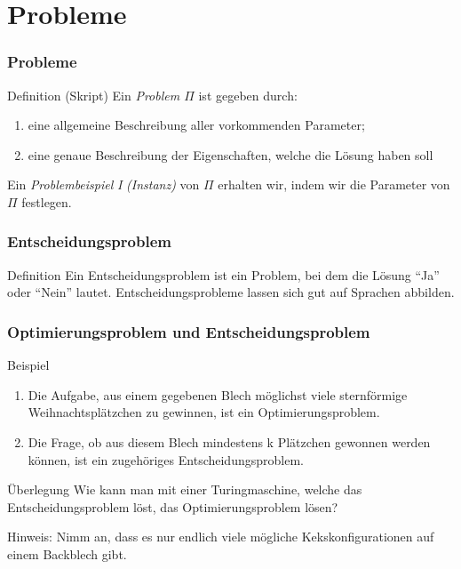 \documentclass{beamer}
\begin{document}
{\section{Probleme}
\begin{frame}
 \frametitle{Probleme}
 \begin{block}{Definition (Skript)}
 Ein \emph{Problem $\Pi$} ist gegeben durch:
 \begin{enumerate}
  \item eine allgemeine Beschreibung aller vorkommenden Parameter;
  \item eine genaue Beschreibung der Eigenschaften, welche die Lösung haben soll
 \end{enumerate}
 \end{block}
 Ein \emph{Problembeispiel} \textit{I} \emph{(Instanz)} von $\Pi$ erhalten wir, indem wir die Parameter von $\Pi$ festlegen.
\end{frame}

\begin{frame}
 \frametitle{Entscheidungsproblem}
 \begin{block}{Definition}
  Ein Entscheidungsproblem ist ein Problem, bei dem die Lösung ``Ja'' oder ``Nein'' lautet. 
  Entscheidungsprobleme lassen sich gut auf Sprachen abbilden.
 \end{block}
\end{frame}

\begin{frame}
 \frametitle{Optimierungsproblem und Entscheidungsproblem}
 \begin{block}{Beispiel}
  \begin{enumerate}
   \item Die Aufgabe, aus einem gegebenen Blech möglichst viele sternförmige Weihnachtsplätzchen zu gewinnen, ist ein Optimierungsproblem.
   \item Die Frage, ob aus diesem Blech mindestens k Plätzchen gewonnen werden können, ist ein zugehöriges Entscheidungsproblem.
  \end{enumerate}
 \end{block}
 \begin{block}{Überlegung}
  Wie kann man mit einer Turingmaschine, welche das Entscheidungsproblem löst, das Optimierungsproblem lösen?
 \end{block}
 Hinweis: Nimm an, dass es nur endlich viele mögliche Kekskonfigurationen auf einem Backblech gibt.
\end{frame}

}
\end{document}

